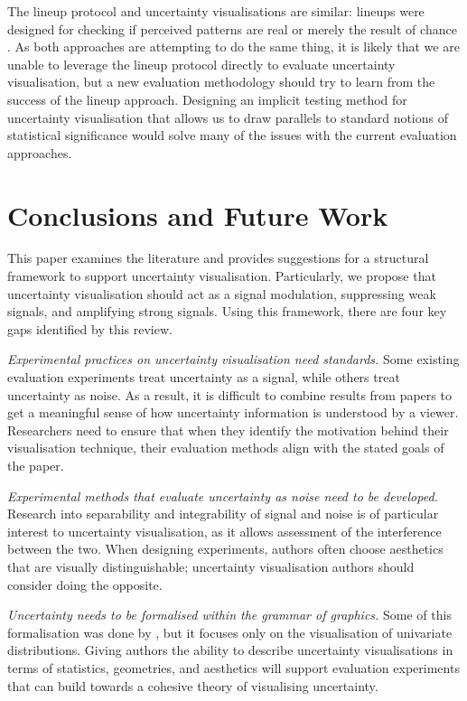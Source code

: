 \documentclass[]{ar-1col-S2O}
\begin{document}
The lineup protocol and uncertainty visualisations are similar: lineups
were designed for checking if perceived patterns are real or merely the
result of chance \citep{Buja2009, Wickham2010}. As both approaches are
attempting to do the same thing, it is likely that we are unable to
leverage the lineup protocol directly to evaluate uncertainty
visualisation, but a new evaluation methodology should try to learn from
the success of the lineup approach. Designing an implicit testing method
for uncertainty visualisation that allows us to draw parallels to
standard notions of statistical significance would solve many of the
issues with the current evaluation approaches.

\section{Conclusions and Future Work}\label{conclusions-and-future-work}

This paper examines the literature and provides suggestions for a
structural framework to support uncertainty visualisation. Particularly,
we propose that uncertainty visualisation should act as a signal
modulation, suppressing weak signals, and amplifying strong signals.
Using this framework, there are four key gaps identified by this review.

\emph{Experimental practices on uncertainty visualisation need
standards.} Some existing evaluation experiments treat uncertainty as a
signal, while others treat uncertainty as noise. As a result, it is
difficult to combine results from papers to get a meaningful sense of
how uncertainty information is understood by a viewer. Researchers need
to ensure that when they identify the motivation behind their
visualisation technique, their evaluation methods align with the stated
goals of the paper.

\emph{Experimental methods that evaluate uncertainty as noise need to be
developed.} Research into separability and integrability of signal and
noise is of particular interest to uncertainty visualisation, as it
allows assessment of the interference between the two. When designing
experiments, authors often choose aesthetics that are visually
distinguishable; uncertainty visualisation authors should consider doing
the opposite.

\emph{Uncertainty needs to be formalised within the grammar of
graphics.} Some of this formalisation was done by \citet{Kay2023}, but
it focuses only on the visualisation of univariate distributions. Giving
authors the ability to describe uncertainty visualisations in terms of
statistics, geometries, and aesthetics will support evaluation
experiments that can build towards a cohesive theory of visualising
uncertainty.
\end{document}
